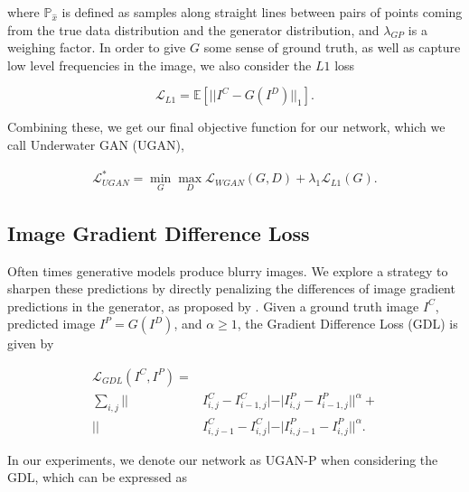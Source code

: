 \noindent where $\mathbb{P}_{\hat{x}}$ is defined as samples along straight lines between pairs of points coming from
the true data distribution and the generator distribution, and $\lambda_{GP}$ is a weighing factor. In order to give $G$
some sense of ground truth, as well as capture low level frequencies in the image, we also consider the $L1$ loss

\begin{equation}
   \mathcal{L}_{L1} = \mathbb{E} [ || I^C - G(I^D) ||_1 ].
\end{equation}

\noindent Combining these, we get our final objective function for our network, which we call Underwater GAN (UGAN),

\begin{equation}
   \begin{aligned}
      \mathcal{L}_{UGAN}^* = \min\limits_{G}\max\limits_{D} \mathcal{L}_{WGAN}(G,D) + \lambda_{1} \mathcal{L}_{L1}(G).
   \end{aligned}
\end{equation}


\subsection{Image Gradient Difference Loss}
Often times generative models produce blurry images. We explore a strategy to sharpen these predictions by
directly penalizing the differences of image gradient predictions in the generator, as proposed by
\cite{mathieu2015deep}. Given a ground truth image $I^C$, predicted image $I^P = G(I^D)$, and $\alpha \geq 1$, the
Gradient Difference Loss (GDL) is given by

\begin{equation}
   \begin{aligned}
      \mathcal{L}_{GDL}(I^C, I^P) = \\ \sum\limits_{i,j} || & I^C_{i,j} - I^C_{i-1,j}| - | I^P_{i,j} - I^P_{i-1,j}||^{\alpha} + \\
      || & I^C_{i,j-1} - I^C_{i,j}| - | I^P_{i,j-1} - I^P_{i,j}||^{\alpha}.
   \end{aligned}
   \label{gdl_eq}
\end{equation}

\noindent In our experiments, we denote our network as UGAN-P when considering the GDL, which can be expressed as

